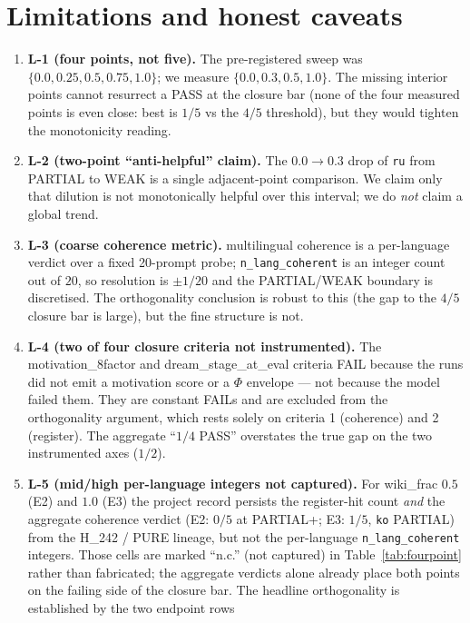 \documentclass[11pt,a4paper]{article}
\begin{document}
\section{Limitations and honest caveats}
\label{sec:limits}

\begin{enumerate}\itemsep0.4em
\item \textbf{L-1 (four points, not five).} The pre-registered sweep was
  $\{0.0,0.25,0.5,0.75,1.0\}$; we measure $\{0.0,0.3,0.5,1.0\}$. The
  missing interior points cannot resurrect a PASS at the closure bar
  (none of the four measured points is even close: best is $1/5$ vs the
  $4/5$ threshold), but they would tighten the monotonicity reading.
\item \textbf{L-2 (two-point ``anti-helpful'' claim).} The
  $0.0\to0.3$ drop of \texttt{ru} from PARTIAL to WEAK is a single
  adjacent-point comparison. We claim only that dilution is not
  monotonically helpful over this interval; we do \emph{not} claim a
  global trend.
\item \textbf{L-3 (coarse coherence metric).} multilingual coherence is a
  per-language verdict over a fixed 20-prompt probe; \verb|n_lang_coherent|
  is an integer count out of $20$, so resolution is $\pm 1/20$ and the
  PARTIAL/WEAK boundary is discretised. The orthogonality conclusion is
  robust to this (the gap to the $4/5$ closure bar is large), but the
  fine structure is not.
\item \textbf{L-4 (two of four closure criteria not instrumented).} The
  motivation\_8factor and dream\_stage\_at\_eval criteria FAIL because the
  runs did not emit a motivation score or a $\Phi$ envelope --- not because
  the model failed them. They are constant FAILs and are excluded from the
  orthogonality argument, which rests solely on criteria 1 (coherence) and
  2 (register). The aggregate ``$1/4$ PASS'' overstates the true gap on
  the two instrumented axes ($1/2$).
\item \textbf{L-5 (mid/high per-language integers not captured).} For
  wiki\_frac $0.5$ (E2) and $1.0$ (E3) the project record persists the
  register-hit count \emph{and} the aggregate coherence verdict (E2:
  $0/5$ at PARTIAL+; E3: $1/5$, \texttt{ko} PARTIAL) from the H\_242 /
  PURE lineage, but not the per-language \verb|n_lang_coherent| integers.
  Those cells are marked ``n.c.'' (not captured) in
  Table~\ref{tab:fourpoint} rather than fabricated; the aggregate verdicts
  alone already place both points on the failing side of the closure bar.
  The headline orthogonality is established by the two endpoint rows

\end{enumerate}
\end{document}
